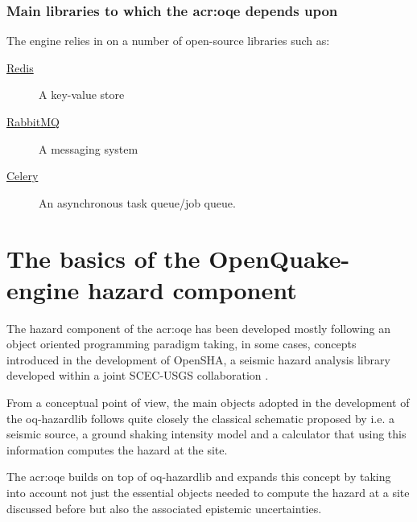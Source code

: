 \subsubsection{Main libraries to which the \gls{acr:oqe} depends upon}
The engine relies in on a number of open-source libraries such as:
\begin{description}
    \item [\href{http://redis.io/}{Redis}] A key-value store
    \item [\href{https://www.rabbitmq.com/}{RabbitMQ}] A messaging system
    \item [\href{http://www.celeryproject.org/}{Celery}] An asynchronous 
        task queue/job queue.
\end{description}
%
\section{The basics of the OpenQuake-engine hazard component}
%
The hazard component of the \gls{acr:oqe} has been developed mostly following 
an object oriented programming paradigm taking, in some cases,  
concepts introduced in the development of OpenSHA, a seismic hazard 
analysis library developed within a joint SCEC-USGS collaboration 
\parencite{field2003}. 

From a conceptual point of view, the main objects adopted in the development
of the oq-hazardlib follows quite closely the classical schematic proposed by
\textcite{reiter1991} i.e. a seismic source, a ground shaking intensity model 
and a calculator that using this information computes the hazard at the site.

The \gls{acr:oqe} builds on top of oq-hazardlib and expands this 
concept by taking into account not just the essential objects 
needed to compute the hazard at a site discussed before but 
also the associated epistemic uncertainties.
%
